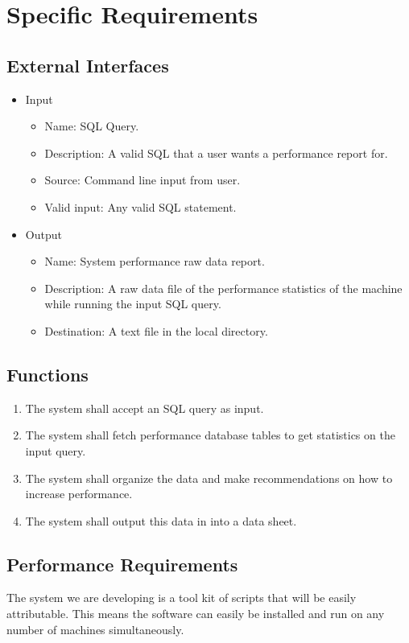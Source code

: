 \documentclass[draftclsnofoot, onecolumn, compsoc, 10pt]{IEEEtran}
\begin{document}
\section{Specific Requirements}

\subsection{External Interfaces}
\begin{itemize}
	\item Input
    \begin{itemize}
    	\item Name: SQL Query.
        \item Description: A valid SQL that a user wants a performance report for.
        \item Source: Command line input from user. 
        \item Valid input: Any valid SQL statement.
    \end{itemize}
    \item Output
    \begin{itemize}
    	\item Name: System performance raw data report.
        \item Description: A raw data file of the performance statistics of the machine while running the input SQL query.
        \item Destination: A text file in the local directory.
    \end{itemize}
\end{itemize}

\subsection{Functions}
\begin{enumerate}
	\item The system shall accept an SQL query as input.
    \item The system shall fetch performance database tables to get statistics on the input query.
    \item The system shall organize the data and make recommendations on how to increase performance.
    \item The system shall output this data in into a data sheet.
\end{enumerate}

\subsection{Performance Requirements}
The system we are developing is a tool kit of scripts that will be easily attributable. 
This means the software can easily be installed and run on any number of machines simultaneously. 
\end{document}
